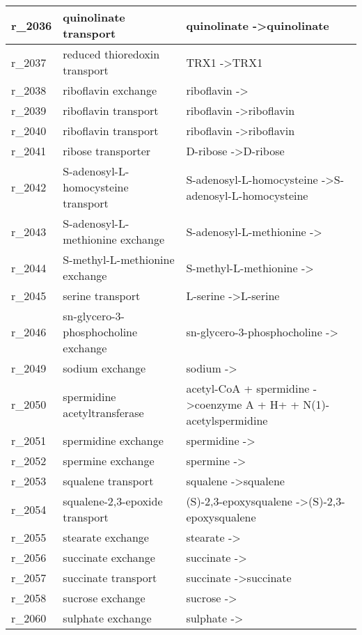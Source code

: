 \begin{landscape}
{\begin{longtable}{|l|p{7cm}|p{15cm}|}
r\_2036 & quinolinate transport & quinolinate  -\textgreater quinolinate \\ \hline
r\_2037 & reduced thioredoxin transport & TRX1  -\textgreater TRX1 \\ \hline
r\_2038 & riboflavin exchange & riboflavin  -\textgreater{} \\ \hline
r\_2039 & riboflavin transport & riboflavin  -\textgreater riboflavin \\ \hline
r\_2040 & riboflavin transport & riboflavin  -\textgreater riboflavin \\ \hline
r\_2041 & ribose transporter & D-ribose  -\textgreater D-ribose \\ \hline
r\_2042 & S-adenosyl-L-homocysteine transport & S-adenosyl-L-homocysteine  -\textgreater S-adenosyl-L-homocysteine \\ \hline
r\_2043 & S-adenosyl-L-methionine exchange & S-adenosyl-L-methionine  -\textgreater{} \\ \hline
r\_2044 & S-methyl-L-methionine exchange & S-methyl-L-methionine  -\textgreater{} \\ \hline
r\_2045 & serine transport & L-serine  -\textgreater L-serine \\ \hline
r\_2046 & sn-glycero-3-phosphocholine exchange & sn-glycero-3-phosphocholine  -\textgreater{} \\ \hline
r\_2049 & sodium exchange & sodium  -\textgreater{} \\ \hline
r\_2050 & spermidine acetyltransferase & acetyl-CoA + spermidine  -\textgreater coenzyme A + H+ + N(1)-acetylspermidine \\ \hline
r\_2051 & spermidine exchange & spermidine  -\textgreater{} \\ \hline
r\_2052 & spermine exchange & spermine  -\textgreater{} \\ \hline
r\_2053 & squalene transport & squalene  -\textgreater squalene \\ \hline
r\_2054 & squalene-2,3-epoxide transport & (S)-2,3-epoxysqualene  -\textgreater (S)-2,3-epoxysqualene \\ \hline
r\_2055 & stearate exchange & stearate  -\textgreater{} \\ \hline
r\_2056 & succinate exchange & succinate  -\textgreater{} \\ \hline
r\_2057 & succinate transport & succinate  -\textgreater succinate \\ \hline
r\_2058 & sucrose exchange & sucrose  -\textgreater{} \\ \hline
r\_2060 & sulphate exchange & sulphate  -\textgreater{} \\ \hline

\end{longtable}}
\end{landscape}
